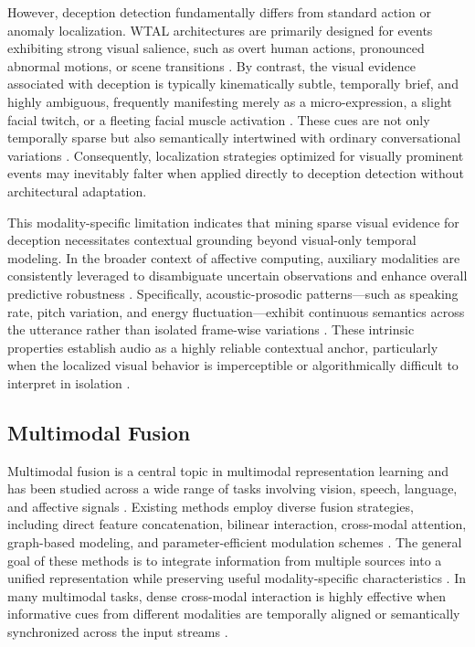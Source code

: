 \documentclass[sigconf,screen,review,anonymous]{acmart}
\begin{document}
However, deception detection fundamentally differs from standard action or anomaly localization. WTAL architectures are primarily designed for events exhibiting strong visual salience, such as overt human actions, pronounced abnormal motions, or scene transitions \cite{sultani2018real, li2023weakly}. By contrast, the visual evidence associated with deception is typically kinematically subtle, temporally brief, and highly ambiguous, frequently manifesting merely as a micro-expression, a slight facial twitch, or a fleeting facial muscle activation \cite{ding2019face, nam2023facialcuenet, ahmed2025deception}. These cues are not only temporally sparse but also semantically intertwined with ordinary conversational variations \cite{ding2019face, nam2023facialcuenet}. Consequently, localization strategies optimized for visually prominent events may inevitably falter when applied directly to deception detection without architectural adaptation.

This modality-specific limitation indicates that mining sparse visual evidence for deception necessitates contextual grounding beyond visual-only temporal modeling. In the broader context of affective computing, auxiliary modalities are consistently leveraged to disambiguate uncertain observations and enhance overall predictive robustness \cite{baltruvsaitis2018multimodal, zhang2025large}. Specifically, acoustic-prosodic patterns—such as speaking rate, pitch variation, and energy fluctuation—exhibit continuous semantics across the utterance rather than isolated frame-wise variations \cite{chen2020acoustic, levitan2018acoustic}. These intrinsic properties establish audio as a highly reliable contextual anchor, particularly when the localized visual behavior is imperceptible or algorithmically difficult to interpret in isolation \cite{chen2020acoustic, levitan2018acoustic, baltruvsaitis2018multimodal}.

\subsection{Multimodal Fusion}
Multimodal fusion is a central topic in multimodal representation learning and has been studied across a wide range of tasks involving vision, speech, language, and affective signals \cite{baltruvsaitis2018multimodal, zhang2025large}. Existing methods employ diverse fusion strategies, including direct feature concatenation, bilinear interaction, cross-modal attention, graph-based modeling, and parameter-efficient modulation schemes \cite{zadeh2017tensor, zhang2022fine, li2024multimodal}. The general goal of these methods is to integrate information from multiple sources into a unified representation while preserving useful modality-specific characteristics \cite{baltruvsaitis2018multimodal}. In many multimodal tasks, dense cross-modal interaction is highly effective when informative cues from different modalities are temporally aligned or semantically synchronized across the input streams \cite{li2024multimodal}.
\end{document}
